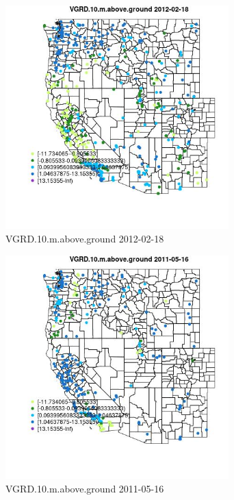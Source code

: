 \begin{figure} 
\centering  
\includegraphics[width=0.77\textwidth]{Code_Outputs/Report_ML_input_PM25_Step4_part_f_de_duplicated_aveswNAs_MapObsVGRD10maboveground2012-02-18.jpg} 
\caption{\label{fig:Report_ML_input_PM25_Step4_part_f_de_duplicated_aveswNAsMapObsVGRD10maboveground2012-02-18}VGRD.10.m.above.ground 2012-02-18} 
\end{figure} 
 

\begin{figure} 
\centering  
\includegraphics[width=0.77\textwidth]{Code_Outputs/Report_ML_input_PM25_Step4_part_f_de_duplicated_aveswNAs_MapObsVGRD10maboveground2011-05-16.jpg} 
\caption{\label{fig:Report_ML_input_PM25_Step4_part_f_de_duplicated_aveswNAsMapObsVGRD10maboveground2011-05-16}VGRD.10.m.above.ground 2011-05-16} 
\end{figure} 
 

